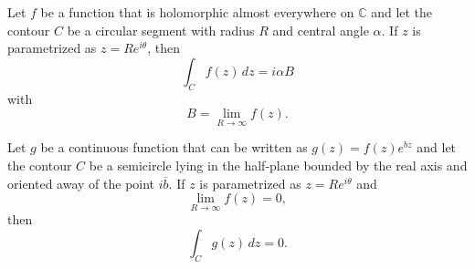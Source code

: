     \begin{theorem}\label{complex:great_limit}
        Let $f$ be a function that is holomorphic almost everywhere on $\mathbb{C}$ and let the contour $C$ be a circular segment with radius $R$ and central angle $\alpha$. If $z$ is parametrized as $z = Re^{i\theta}$, then \[\int_Cf(z)\,dz = i\alpha B\] with \[B = \lim_{R\rightarrow\infty}f(z).\]
    \end{theorem}

    \begin{theorem}\label{complex:jordan}
        Let $g$ be a continuous function that can be written as $g(z) = f(z)e^{bz}$ and let the contour $C$ be a semicircle lying in the half-plane bounded by the real axis and oriented away of the point $i\overline{b}$. If $z$ is parametrized as $z=Re^{i\theta}$ and \[\lim_{R\rightarrow\infty}f(z) = 0,\] then \[\int_Cg(z)\,dz = 0.\]
    \end{theorem}
